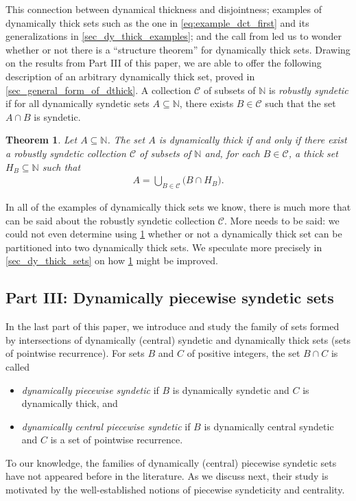\documentclass[letter,11pt]{article}
\theoremstyle{plain}
\theoremstyle{definition}
\theoremstyle{plain}
\newcounter{MainTheoremCounter}
\newtheorem{Maintheorem}[MainTheoremCounter]{Theorem}
\theoremstyle{plain}
\numberwithin{equation}{section}
\newcommand{\N}{\mathbb{N}}
\newcommand{\collection}{\mathscr{C}}
\begin{document}
This connection between dynamical thickness and disjointness; examples of dynamically thick sets such as the one in \eqref{eq:example_dct_first} and its generalizations in \cref{sec_dy_thick_examples}; and the call from \cite[Question 9.6]{glasner_tsankov_weiss_zucker_2021} led us to wonder whether or not there is a ``structure theorem'' for dynamically thick sets. Drawing on the results from Part III of this paper, we are able to offer the following description of an arbitrary dynamically thick set, proved in \cref{sec_general_form_of_dthick}.  A collection $\collection$ of subsets of $\N$ is \emph{robustly syndetic} if for all dynamically syndetic sets $A \subseteq \N$, there exists $B \in \collection$ such that the set $A \cap B$ is syndetic.

\begin{Maintheorem}
\label{mainthm_structure_for_dy_thick_sets}
\label{cor_weak_structure_result}
    Let $A \subseteq \N$.  The set $A$ is dynamically thick if and only if there exist a robustly syndetic collection $\collection$ of subsets of $\N$ and, for each $B \in \collection$, a thick set $H_B \subseteq \N$ such that
\begin{align}
\label{eqn_A_contains_family_cap_thick}
    A = \bigcup_{B \in \collection} \big( B \cap H_B\big).
\end{align}
\end{Maintheorem}

In all of the examples of dynamically thick sets we know, there is much more that can be said about the robustly syndetic collection $\collection$.  More needs to be said: we could not even determine using \cref{mainthm_structure_for_dy_thick_sets} whether or not a dynamically thick set can be partitioned into two dynamically thick sets.  We speculate more precisely in \cref{sec_dy_thick_sets} on how \cref{mainthm_structure_for_dy_thick_sets} might be improved.




\subsection{Part III: Dynamically piecewise syndetic sets}

In the last part of this paper, we introduce and study the family of sets formed by intersections of dynamically (central) syndetic and dynamically thick sets (sets of pointwise recurrence).  
For sets $B$ and $C$ of positive integers, the set $B \cap C$ is called 
\begin{itemize}
    \item \emph{dynamically piecewise syndetic} if $B$ is dynamically syndetic and $C$ is dynamically thick, and

    \item \emph{dynamically central piecewise syndetic} if $B$ is dynamically central syndetic and $C$ is a set of pointwise recurrence.
\end{itemize}
To our knowledge, the families of dynamically (central) piecewise syndetic sets have not appeared before in the literature.  As we discuss next, their study is motivated by the well-established notions of piecewise syndeticity and centrality.
\end{document}
